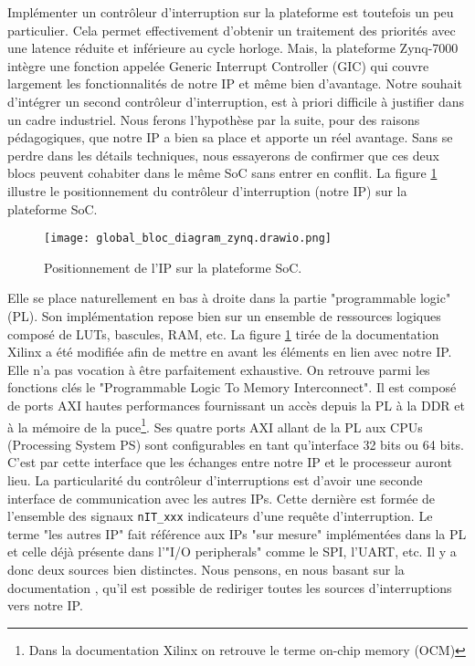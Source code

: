 Implémenter un contrôleur d'interruption sur la plateforme est toutefois un peu particulier.
Cela permet effectivement d'obtenir un traitement des priorités avec une latence réduite et inférieure au cycle horloge.
Mais, la plateforme Zynq-7000 intègre une fonction appelée Generic Interrupt Controller (GIC) qui couvre largement les fonctionnalités de notre IP et même bien d'avantage.
Notre souhait d'intégrer un second contrôleur d'interruption, est à priori difficile à justifier dans un cadre industriel.
Nous ferons l'hypothèse par la suite, pour des raisons pédagogiques, que notre IP a bien sa place et apporte un réel avantage.
Sans se perdre dans les détails techniques, nous essayerons de confirmer que ces deux blocs peuvent cohabiter dans le même SoC sans entrer en conflit.
La figure \ref{fig:soc} illustre le positionnement du contrôleur d'interruption (notre IP) sur la plateforme SoC.
\begin{figure}[H]
    \centering
    \texttt{[image: global\_bloc\_diagram\_zynq.drawio.png]}
    \caption{Positionnement de l'IP sur la plateforme SoC.}
    \label{fig:soc}
\end{figure}
Elle se place naturellement en bas à droite dans la partie "programmable logic" (PL).
Son implémentation repose bien sur un ensemble de ressources logiques composé de LUTs, bascules, RAM, etc.
La figure \ref{fig:soc} tirée de la documentation Xilinx \cite{Tech_Man_Xilinx} a été modifiée afin de mettre en avant les éléments en lien avec notre IP.
Elle n'a pas vocation à être parfaitement exhaustive.
On retrouve parmi les fonctions clés le "Programmable Logic To Memory Interconnect".
Il est composé de ports AXI hautes performances fournissant un accès depuis la PL à la DDR et à la mémoire de la puce\footnote{Dans la documentation Xilinx on retrouve le terme on-chip memory (OCM)}.
Ses quatre ports AXI allant de la PL aux CPUs (Processing System PS) sont configurables en tant qu'interface 32 bits ou 64 bits.
C'est par cette interface que les échanges entre notre IP et le processeur auront lieu.
La particularité du contrôleur d'interruptions est d'avoir une seconde interface de communication avec les autres IPs.
Cette dernière est formée de l'ensemble des signaux \texttt{nIT\_xxx} indicateurs d'une requête d'interruption.
Le terme "les autres IP" fait référence aux IPs "sur mesure" implémentées dans la PL et celle déjà présente dans l'"I/O peripherals" comme le SPI, l'UART, etc.
Il y a donc deux sources bien distinctes.
Nous pensons, en nous basant sur la documentation \cite{Tech_Man_Xilinx}, qu'il est possible de rediriger toutes les sources d'interruptions vers notre IP.
